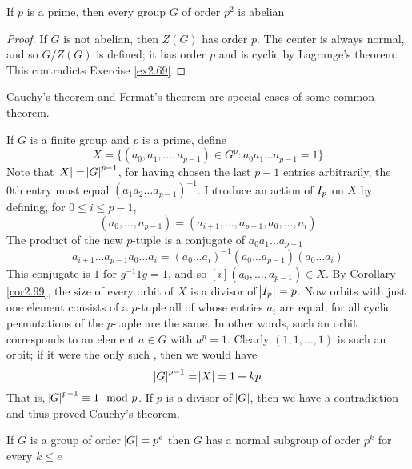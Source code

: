 \documentclass[11pt]{article}
\begin{document}
\begin{corollary}[]
If \(p\) is a prime, then every group \(G\) of order \(p^2\) is abelian
\end{corollary}
\begin{proof}
If \(G\) is not abelian, then \(Z(G)\) has order \(p\). The center is always normal, and
so \(G/Z(G)\) is defined; it has order \(p\) and is cyclic by Lagrange's theorem. 
This contradicts Exercise \ref{ex2.69}
\end{proof}

\begin{examplle}[]
Cauchy's theorem and Fermat's theorem are special cases of some common theorem.

If \(G\) is a finite group and \(p\) is a prime, define
\begin{equation*}
X=\{(a_0,a_1,\dots,a_{p-1})\in G^p:a_0a_1\dots a_{p-1}=1\}
\end{equation*}
Note that \(\abs{X}=\abs{G}^{p-1}\), for having chosen the last \(p-1\) entries
arbitrarily, the 0th entry must equal \((a_1a_2\dots a_{p-1})^{-1}\). Introduce an
action of \(\relax{I}_p\) on \(X\) by defining, for \(0\le i\le p-1\),
\begin{equation*}
[i](a_0,\dots,a_{p-1})=(a_{i+1},\dots,a_{p-1},a_0,\dots,a_i)
\end{equation*}
The product of the new \(p\)-tuple is a conjugate of \(a_0a_1\dots a_{p-1}\)
\begin{equation*}
a_{i+1}\dots a_{p-1}a_0\dots a_{i}=(a_0\dots a_i)^{-1}(a_0\dots a_{p-1})
(a_0\dots a_i)
\end{equation*}
This conjugate is \(1\) for \(g^{-1}1g=1\), and so \([i](a_0,\dots,a_{p-1})\in X\). By
Corollary \ref{cor2.99}, the size of every orbit of \(X\) is a divisor of
\(\abs{\relax{I}_p}=p\). Now orbits with just one element consists of a \(p\)-tuple all
of whose entries \(a_i\) are equal, for all cyclic permutations of the \(p\)-tuple
are the same. In other words, such an orbit corresponds to an element \(a\in G\)
with \(a^p=1\). Clearly \((1,1,\dots,1)\) is such an orbit; if it were the only such
, then we would have
\begin{equation*}
\abs{G}^{p-1}=\abs{X}=1+kp
\end{equation*}
That is, \(\abs{G}^{p-1}\equiv 1\mod p\). If \(p\) is a divisor of \(\abs{G}\), then
we have a contradiction and thus proved Cauchy's theorem.
\end{examplle}

\begin{proposition}[]
If \(G\) is a group of order \(\abs{G}=p^e\) then \(G\) has a normal subgroup of order
\(p^k\) for every \(k\le e\)
\end{proposition}
\end{document}
